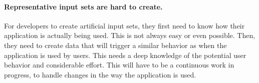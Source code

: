

    \paragraph{Representative input sets are hard to create.} For developers to create artificial input sets, they first need to know how
    their application is actually being used. This is not always easy or even possible. Then, they need to create data that will trigger a
    similar behavior as when the application is used by users. This needs a deep knowledge of the potential user behavior and
    considerable effort. This will have to be a continuous work in
    progress, to handle changes in the way the application is used.

